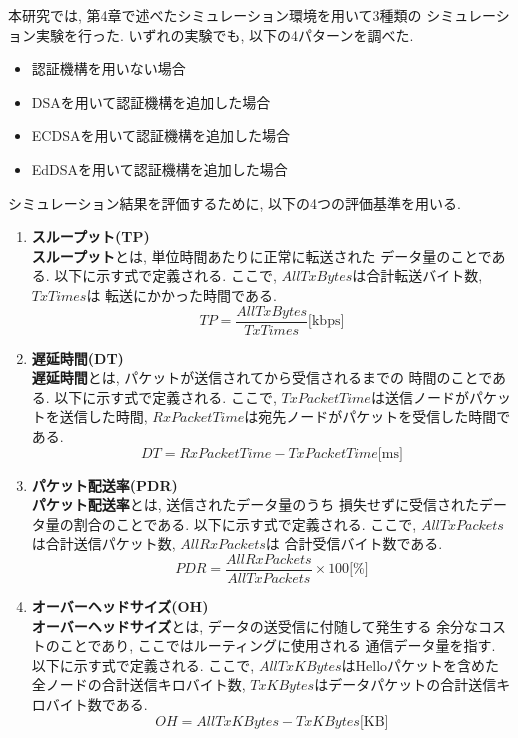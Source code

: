 本研究では, 第4章で述べたシミュレーション環境を用いて3種類の
シミュレーション実験を行った. いずれの実験でも, 以下の4パターンを調べた. 
\begin{itemize}
  \item 認証機構を用いない場合
  \item DSAを用いて認証機構を追加した場合
  \item ECDSAを用いて認証機構を追加した場合
  \item EdDSAを用いて認証機構を追加した場合
\end{itemize}
\indent シミュレーション結果を評価するために, 
以下の4つの評価基準を用いる. 
\begin{enumerate}
  \item \textbf{スループット(TP)}\\
  \indent \textbf{スループット}とは, 単位時間あたりに正常に転送された
  データ量のことである. 以下に示す式で定義される. ここで, 
  $AllTxBytes$は合計転送バイト数, $TxTimes$は
  転送にかかった時間である. \\
  \[
    TP = \frac{AllTxBytes}{TxTimes}\text{[kbps]}
  \]
  \item \textbf{遅延時間(DT)}\\
  \indent \textbf{遅延時間}とは, パケットが送信されてから受信されるまでの
  時間のことである. 以下に示す式で定義される. ここで,
  $TxPacketTime$は送信ノードがパケットを送信した時間, 
  $RxPacketTime$は宛先ノードがパケットを受信した時間である. \\
  \[
    DT = RxPacketTime - TxPacketTime \text{[ms]}
  \]

  \item \textbf{パケット配送率(PDR)}\\
  \indent \textbf{パケット配送率}とは, 送信されたデータ量のうち
  損失せずに受信されたデータ量の割合のことである. 以下に示す式で定義される. 
  ここで, $AllTxPackets$は合計送信パケット数, $AllRxPackets$は
  合計受信バイト数である. \\
  \[
    PDR = \frac{AllRxPackets}{AllTxPackets} \times 100 \text{[\%]}
  \]

  \item \textbf{オーバーヘッドサイズ(OH)}\\
  \indent \textbf{オーバーヘッドサイズ}とは, データの送受信に付随して発生する
  余分なコストのことであり, ここではルーティングに使用される
  通信データ量を指す. 以下に示す式で定義される. ここで, 
  $AllTxKBytes$はHelloパケットを含めた全ノードの合計送信キロバイト数, 
  $TxKBytes$はデータパケットの合計送信キロバイト数である. \\
  \[
    OH = AllTxKBytes - TxKBytes \text{[KB]}
  \]
\end{enumerate}
\vspace{2em}

